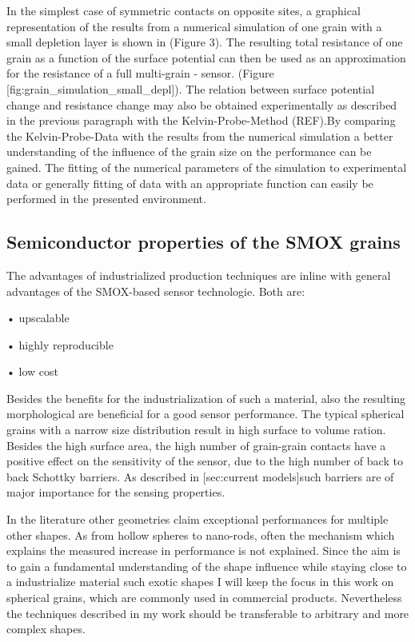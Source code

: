 \documentclass[11pt]{article}
\begin{document}
In the simplest case of symmetric contacts on opposite sites, a
graphical representation of the results from a numerical simulation of
one grain with a small depletion layer is shown in (Figure 3). The
resulting total resistance of one grain as a function of the surface
potential can then be used as an approximation for the resistance of a
full multi-grain - sensor. (Figure
{[}fig:grain\_simulation\_small\_depl{]}). The relation between surface
potential change and resistance change may also be obtained
experimentally as described in the previous paragraph with the
Kelvin-Probe-Method (REF).By comparing the Kelvin-Probe-Data with the
results from the numerical simulation a better understanding of the
influence of the grain size on the performance can be gained. The
fitting of the numerical parameters of the simulation to experimental
data or generally fitting of data with an appropriate function can
easily be performed in the presented environment.

    \hypertarget{semiconductor-properties-of-the-smox-grains}{%
\subsection{Semiconductor properties of the SMOX
grains}\label{semiconductor-properties-of-the-smox-grains}}

The advantages of industrialized production techniques are inline with
general advantages of the SMOX-based sensor technologie. Both are:

• upscalable

• highly reproducible

• low cost

Besides the benefits for the industrialization of such a material, also
the resulting morphological are beneficial for a good sensor
performance. The typical spherical grains with a narrow size
distribution result in high surface to volume ration. Besides the high
surface area, the high number of grain-grain contacts have a positive
effect on the sensitivity of the sensor, due to the high number of back
to back Schottky barriers. As described in {[}sec:current models{]}such
barriers are of major importance for the sensing properties.

In the literature other geometries claim exceptional performances for
multiple other shapes. As from hollow spheres to nano-rods, often the
mechanism which explains the measured increase in performance is not
explained. Since the aim is to gain a fundamental understanding of the
shape influence while staying close to a industrialize material such
exotic shapes I will keep the focus in this work on spherical grains,
which are commonly used in commercial products. Nevertheless the
techniques described in my work should be transferable to arbitrary and
more complex shapes.
\end{document}
